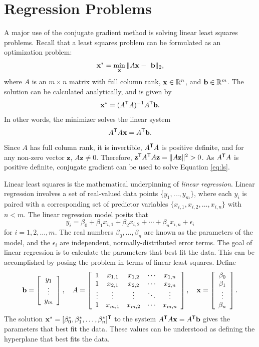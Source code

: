 \section*{Regression Problems} %

A major use of the conjugate gradient method is solving linear least squares problems.
Recall that a least squares problem can be formulated as an optimization problem:
\[
\mathbf{x}^* = \min_{\mathbf{x}} \|A\mathbf{x} -\textbf{ b}\|_2,
\]
where $A$ is an $m \times n$ matrix with full column rank, $\mathbf{x} \in \mathbb{R}^n$, and $\mathbf{b} \in \mathbb{R}^m$. The solution can
be calculated analytically, and is given by
\[
\mathbf{x}^* = (A^{\mathsf T} A)^{-1}A^{\mathsf T} \mathbf{b}.
\]
In other words, the minimizer solves the linear system
\begin{equation}
A^{\mathsf T} A\mathbf{x} = A^{\mathsf T} \mathbf{b}.
\label{eq:ls}
\end{equation}
Since $A$ has full column rank, it is invertible, $A^{\mathsf T} A$ is positive definite, and for any non-zero vector $\textbf{z}$, $A\textbf{z}\neq 0$.
Therefore, $\textbf{z}^{\mathsf T} A^{\mathsf T} A\textbf{z} = \Vert A\textbf{z} \Vert^2 > 0$.
As $A^{\mathsf T} A$ is positive definite, conjugate gradient can be used to solve Equation \ref{eq:ls}.

Linear least squares is the mathematical underpinning of \emph{linear regression}.
Linear regression involves a set of real-valued data points \{$y_1,\ldots, y_m\}$, where each
$y_i$ is paired with a corresponding set of predictor variables $\{x_{i,1}, x_{i,2}, \ldots, x_{i,n}\}$ with $n < m$.
The linear regression model posits that
\[
y_i = \beta_0 + \beta_1 x_{i,1} + \beta_2 x_{i,2} + \cdots + \beta_n x_{i,n} + \epsilon_i
\]
for $i = 1, 2, \ldots, m$.
The real numbers $\beta_0,\ldots,\beta_n$ are known as the parameters of the model, and the $\epsilon_i$ are independent, normally-distributed error terms.
The goal of linear regression is to calculate the parameters that best fit the data.
This can be accomplished by posing the problem in terms of linear least squares.
Define
\[
\mathbf{b} = \left[\begin{array}{c}y_1 \\ \vdots \\ y_m\end{array}\right],
\quad
A =
\left[\begin{array}{ccccc}
1 & x_{1,1} & x_{1,2} & \cdots & x_{1,n}\\
1 & x_{2,1} & x_{2,2} & \cdots & x_{2,n}\\
\vdots & \vdots & \vdots & \ddots & \vdots\\
1 & x_{m,1} & x_{m,2} & \cdots & x_{m,n}
\end{array}\right],
\quad
\mathbf{x} = \left[\begin{array}{c}
    \beta_0 \\ \beta_1 \\ \vdots \\ \beta_n
\end{array}\right].
\]
The solution $\mathbf{x}^* = [\beta_0^*, \beta_1^*, \ldots, \beta_n^*]^{\mathsf T}$ to the system $A^{\mathsf T} A\mathbf{x} = A^{\mathsf T}\mathbf{b}$ gives the parameters that best fit the data.
These values can be understood as defining the hyperplane that best fits the data.

